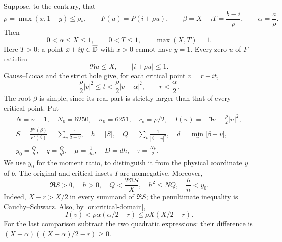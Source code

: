 Suppose, to the contrary, that
\[
 \rho=\max(x,1-y)\le\rho_*,\qquad
 F(u)=P(i+\rho u),\qquad
 \beta=X-iT=\frac{b-i}{\rho},\qquad \alpha=\frac a\rho.
\]
Then
\begin{equation}\label{or:normalization}
 0<\alpha\le X\le1,\qquad 0<T\le1,\qquad \max(X,T)=1.
\end{equation}
Here $T>0$: a point $x+iy\in\overline{\mathbb D}$ with $x>0$ cannot have
$y=1$.  Every zero $u$ of $F$ satisfies
\begin{equation}\label{or:original-domain}
                  \Re u\le X,\qquad |i+\rho u|\le1.
\end{equation}
Gauss--Lucas and the strict hole give, for each critical point $v=r-it$,
\begin{equation}\label{or:critical-domain}
 \frac\rho2|v|^2\le t<\frac\rho2|v-\alpha|^2,
                  \qquad r<\frac\alpha2.
\end{equation}
The root $\beta$ is simple, since its real part is strictly larger than
that of every critical point.  Put
\begin{equation}\label{or:notation}
 \begin{gathered}
 N=n-1,\quad N_0=6250,\quad n_0=6251,\quad c_\rho=\rho/2,\quad
 I(u)=-\Im u-\frac\rho2|u|^2,\\
 S=\frac{F''(\beta)}{F'(\beta)}=\sum_v\frac1{\beta-v},\quad
 h=|S|,\quad Q=\sum_v\frac1{|\beta-v|^2},\quad
 d=\min_v|\beta-v|,\\
 y_0=\frac Qh,\quad q=\frac Q{h^2},\quad
 \mu=\frac1{dh},\quad D=dh,\quad \tau=\frac{N\rho}{2}.
 \end{gathered}
\end{equation}
We use $y_0$ for the moment ratio, to distinguish it from the physical
coordinate $y$ of $b$.  The original and critical insets $I$ are
nonnegative.  Moreover,
\begin{equation}\label{or:horizontal}
 \Re S>0,\quad h>0,\quad
 Q<\frac{2\Re S}{X},\quad h^2\le NQ,\quad \frac hn<y_0.
\end{equation}
Indeed, $X-r>X/2$ in every summand of $\Re S$; the penultimate
inequality is Cauchy--Schwarz.  Also, by
\eqref{or:critical-domain},
\begin{equation}\label{or:inset-critical}
 I(v)<\rho\alpha(\alpha/2-r)\le\rho X(X/2-r).
\end{equation}
For the last comparison subtract the two quadratic expressions: their
difference is $(X-\alpha)((X+\alpha)/2-r)\ge0$.

